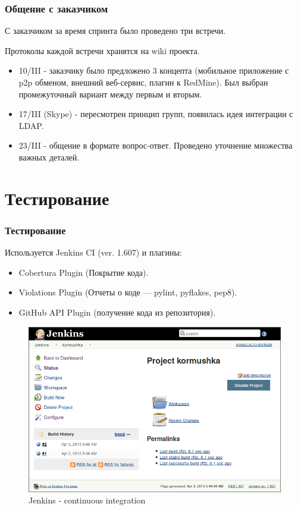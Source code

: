 \documentclass{beamer}
\newlength{\wideitemsep}
\let\olditem\item
\renewcommand{\item}{\setlength{\itemsep}{\wideitemsep}\olditem}
\begin{document}
\begin{frame}
\frametitle{Общение с заказчиком}

С заказчиком за время спринта было проведено три встречи.

Протоколы каждой встречи хранятся на wiki проекта.

\begin{itemize}
\item 10/III - заказчику было предложено 3 концепта (мобильное приложение с p2p обменом, внешний веб-сервис, плагин к RedMine). Был выбран промежуточный вариант между первым и вторым.
\item 17/III (Skype) - пересмотрен принцип групп, появилась идея интеграции с LDAP.
\item 23/III - общение в формате вопрос-ответ. Проведено уточнение множества важных деталей.
\end{itemize}

\end{frame}


\section{Тестирование}

\begin{frame}
\frametitle{Тестирование}

Используется Jenkins CI (ver. 1.607) и плагины:

\begin{itemize}
\item Cobertura Plugin (Покрытие кода).
\item Violations Plugin (Отчеты о коде — pylint, pyflakes, pep8).
\item GitHub API Plugin (получение кода из репозитория).
\end{itemize}


\begin{figure}
\includegraphics[scale=0.25]{res/r2_jenkins}
\caption{Jenkins - continuous integration}
\end{figure}

\end{frame}
\end{document}
